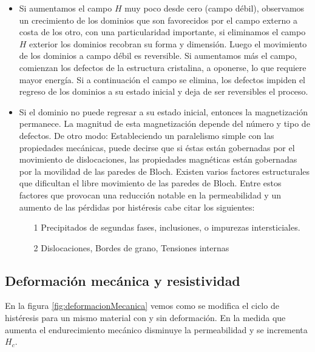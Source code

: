 \begin{itemize}
	\item Si aumentamos el campo $H$ muy poco desde cero (campo débil), observamos un crecimiento de los dominios que son favorecidos por el campo externo a costa de los otro, con una particularidad importante, si eliminamos el campo $H$ exterior los dominios recobran su forma y dimensión.
Luego el movimiento de los dominios a campo débil es reversible. Si aumentamos más el campo, comienzan los defectos de la estructura cristalina, a oponerse, lo que requiere mayor energía. Si a continuación el campo se elimina, los defectos impiden el regreso de los dominios a su estado inicial y deja de ser reversibles el proceso.

	\item Si el dominio no puede regresar a su estado inicial, entonces la magnetización permanece. La magnitud de esta magnetización depende del número y tipo de defectos. De otro modo: Estableciendo un paralelismo simple con las propiedades mecánicas, puede decirse que si éstas están gobernadas por el movimiento de dislocaciones, las propiedades magnéticas están gobernadas por la movilidad de las paredes de Bloch. Existen varios factores estructurales que dificultan el libre movimiento de las paredes de Bloch. Entre estos factores que provocan una reducción notable en la permeabilidad y un aumento de las pérdidas por histéresis cabe citar los siguientes:
	\begin{itemize}
		\item[1] Precipitados de segundas fases, inclusiones, o impurezas intersticiales.
		\item[2] Dislocaciones, Bordes de grano, Tensiones internas
	\end{itemize}

\end{itemize}


\subsection{Deformación mecánica y resistividad}

En la figura \ref{fig:deformacionMecanica} vemos como se modifica el ciclo de histéresis para un mismo material con y sin deformación. En la medida que aumenta el endurecimiento mecánico disminuye la permeabilidad y se incrementa $H_{c}$.


